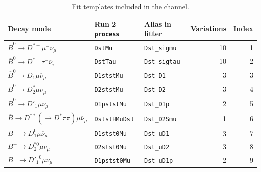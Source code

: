 \begin{table}[!htb]
    \caption{Fit templates included in the \Dstar channel.}
    \label{tab:fit-templates-dst}
    \footnotesize
    \centering

\begin{tabular}{lllrr}
\toprule
 \textbf{Decay mode}                                                               & \textbf{Run 2 \texttt{process}}   & \textbf{Alias in fitter}   &   \textbf{Variations} &   \textbf{Index} \\
\midrule
 $\overline{B}^0 \rightarrow D^{*+} \mu^- \overline{\nu}_\mu$                      & \texttt{DstMu}                    & \texttt{Dst\_sigmu}        &                    10 &                1 \\
 $\overline{B}^0 \rightarrow D^{*+} \tau^- \overline{\nu}_\tau$                    & \texttt{DstTau}                   & \texttt{Dst\_sigtau}       &                    10 &                2 \\
 $\overline{B}^0 \rightarrow D_1 \mu \overline{\nu}_\mu$                           & \texttt{D1ststMu}                 & \texttt{Dst\_D1}           &                     3 &                3 \\
 $\overline{B}^0 \rightarrow D^*_2 \mu \overline{\nu}_\mu$                         & \texttt{D2ststMu}                 & \texttt{Dst\_D2}           &                     3 &                4 \\
 $\overline{B}^0 \rightarrow D'_1 \mu \overline{\nu}_\mu$                          & \texttt{D1pststMu}                & \texttt{Dst\_D1p}          &                     2 &                5 \\
 $\overline{B} \rightarrow D^{**} (\rightarrow D^* \pi\pi) \mu \overline{\nu}_\mu$ & \texttt{DststHMuDst}              & \texttt{Dst\_D2Smu}        &                     1 &                6 \\
 $B^- \rightarrow D_1^0 \mu \overline{\nu}_\mu$                                    & \texttt{D1stst0Mu}                & \texttt{Dst\_uD1}          &                     3 &                7 \\
 $B^- \rightarrow D_2^{*0} \mu \overline{\nu}_\mu$                                 & \texttt{D2stst0Mu}                & \texttt{Dst\_uD2}          &                     3 &                8 \\
 $B^- \rightarrow {D'_1}^0 \mu \overline{\nu}_\mu$                                 & \texttt{D1pstst0Mu}               & \texttt{Dst\_uD1p}         &                     2 &                9 \\

\end{tabular}
\end{table}
